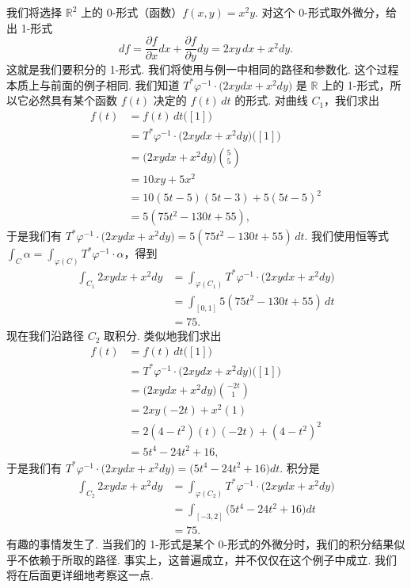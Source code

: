 我们将选择 $\mathbb{R}^2$ 上的 0-形式（函数）$f(x,y)=x^2y$. 对这个 0-形式取外微分，给出 1-形式
\[
df=\frac{\partial f}{\partial x}dx+\frac{\partial f}{\partial y}dy=2xy\,dx+x^2dy.
\]
这就是我们要积分的 1-形式. 我们将使用与例一中相同的路径和参数化. 这个过程本质上与前面的例子相同. 我们知道 $T^*\varphi^{-1}\cdot\bigl(2xydx+x^2dy\bigr)$ 是 $\mathbb{R}$ 上的 1-形式，所以它必然具有某个函数 $f(t)$ 决定的 $f(t)\,dt$ 的形式. 对曲线 $C_1$，我们求出
\begin{align*}
f(t)&=f(t)\,dt\bigl([1]\bigr)\\
&=T^*\varphi^{-1}\cdot\bigl(2xydx+x^2dy\bigr)\bigl([1]\bigr)\\
&=\bigl(2xydx+x^2dy\bigr)\binom{5}{5}\\
&=10xy+5x^2\\
&=10(5t-5)(5t-3)+5(5t-5)^2\\
&=5(75t^2-130t+55),
\end{align*}
于是我们有 $T^*\varphi^{-1}\cdot\bigl(2xydx+x^2dy\bigr)=5(75t^2-130t+55)\,dt$. 我们使用恒等式 $\int_C\alpha=\int_{\varphi(C)}T^*\varphi^{-1}\cdot\alpha$，得到
\begin{align*}
\int_{C_1}2xydx+x^2dy
&=\int_{\varphi(C_1)}T^*\varphi^{-1}\cdot\bigl(2xydx+x^2dy\bigr)\\
&=\int_{[0,1]}5(75t^2-130t+55)\,dt\\
&=75.
\end{align*}
现在我们沿路径 $C_2$ 取积分. 类似地我们求出
\begin{align*}
f(t)&=f(t)\,dt\bigl([1]\bigr)\\
&=T^*\varphi^{-1}\cdot\bigl(2xydx+x^2dy\bigr)\bigl([1]\bigr)\\
&=\bigl(2xydx+x^2dy\bigr)\binom{-2t}{1}\\
&=2xy(-2t)+x^2(1)\\
&=2(4-t^2)(t)(-2t)+(4-t^2)^2\\
&=5t^4-24t^2+16,
\end{align*}
于是我们有 $T^*\varphi^{-1}\cdot\bigl(2xydx+x^2dy\bigr)=\bigl(5t^4-24t^2+16\bigr)dt$. 积分是
\begin{align*}
\int_{C_2}2xydx+x^2dy
&=\int_{\varphi(C_2)}T^*\varphi^{-1}\cdot\bigl(2xydx+x^2dy\bigr)\\
&=\int_{[-3,2]}\bigl(5t^4-24t^2+16\bigr)dt\\
&=75.
\end{align*}
有趣的事情发生了. 当我们的 1-形式是某个 0-形式的外微分时，我们的积分结果似乎不依赖于所取的路径. 事实上，这普遍成立，并不仅仅在这个例子中成立. 我们将在后面更详细地考察这一点.

